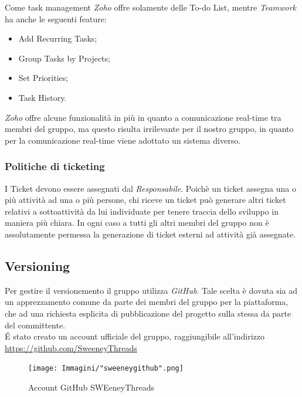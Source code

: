 \documentclass[a4paper]{report}
\begin{document}
	Come task management \emph{Zoho} offre solamente delle To-do List, mentre \emph{Teamwork} ha anche le seguenti
	feature:
	\begin{itemize}
		\item Add Recurring Tasks;
		\item Group Tasks by Projects;
		\item Set Priorities;
		\item Task History.
	\end{itemize}
	\emph{Zoho} offre alcune funzionalità in più in quanto a comunicazione real-time tra membri del gruppo,
	ma questo risulta irrilevante per il nostro gruppo, in quanto per la comunicazione real-time viene
	adottato un sistema diverso.
	\subsubsection{Politiche di ticketing}
		I Ticket devono essere assegnati dal \emph{Responsabile}. Poichè un ticket assegna una o più attività ad una o più 
		persone, chi riceve un ticket può generare altri ticket relativi a sottoattività da lui individuate per tenere traccia 
		dello sviluppo in maniera più chiara. In ogni caso a tutti gli altri membri del gruppo non è assolutamente permessa la
		 generazione di ticket esterni ad attività già assegnate.
	\subsection{Versioning}
	Per gestire il versionemento il gruppo utilizza \emph{GitHub}. Tale scelta è dovuta sia ad un apprezzamento
	comune da parte dei membri del gruppo per la piattaforma, che ad una richiesta esplicita di pubblicazione del 
	progetto sulla stessa da parte del committente. \\
	\'E stato creato un account ufficiale del gruppo, raggiungibile all'indirizzo 
	\url{https://github.com/SweeneyThreads}
	\begin{figure}[H]
		\centering
		\texttt{[image: Immagini/"sweeneygithub".png]}
		\caption{Account GitHub SWEeneyThreads}
	\end{figure}
\end{document}
